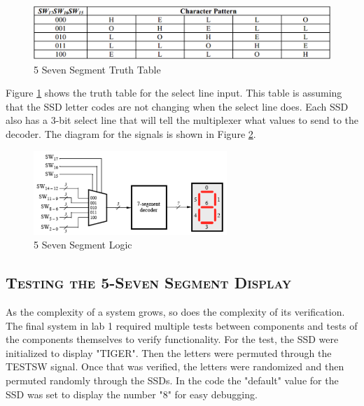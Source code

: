\documentclass[11pt]{report}
\begin{document}
\begin{spacing}{1.5}
\vspace{30px}
\begin{figure}[H]
    \centering
    \includegraphics[width=1\textwidth]{5_ssd_truth}
    \caption{5 Seven Segment Truth Table}
    \label{fig:5_ssd_truth}
\end{figure}

Figure \ref{fig:5_ssd_truth} shows the truth table for the select line input.  This table is assuming that the SSD letter codes are not changing when the select line does.  Each SSD also has a 3-bit select line that will tell the multiplexer what values to send to the decoder.  The diagram for the signals is shown in Figure \ref{fig:5_ssd_logic}.

\vspace{30px}
\begin{figure}[H]
    \centering
    \includegraphics[width=0.65\textwidth]{5_ssd_logic}
    \caption{5 Seven Segment Logic}
    \label{fig:5_ssd_logic}
\end{figure}
\vspace{15px}

\subsection{\scshape Testing the 5-Seven Segment Display}
\label{sub:test_5_ssd}

As the complexity of a system grows, so does the complexity of its verification.  The final system in lab 1 required multiple tests between components and tests of the components themselves to verify functionality.  For the test, the SSD were initialized to display "TIGER".  Then the letters were permuted through the TESTSW signal.  Once that was verified, the letters were randomized and then permuted randomly through the SSDs.  In the code the "default" value for the SSD was set to display the number "8" for easy debugging.


\end{spacing}
\end{document}
